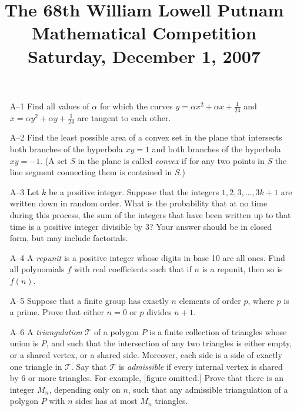 \documentclass[amssymb,twocolumn,pra,10pt,aps]{revtex4-1}
\begin{document}
\title{The 68th William Lowell Putnam Mathematical Competition \\
    Saturday, December 1, 2007}
\maketitle

\begin{itemize}

\item[A--1]
Find all values of $\alpha$ for which the curves $y = \alpha x^2 +
\alpha x + \frac{1}{24}$ and $x = \alpha y^2 + \alpha y + \frac{1}{24}$
are tangent to each other.

\item[A--2]
Find the least possible area of a convex set in the plane that
intersects both branches of the hyperbola $xy = 1$ and both branches of
the hyperbola $xy = -1$. (A set $S$ in the plane is called \emph{convex}
if for any two points in $S$ the line segment connecting them is
contained in $S$.)

\item[A--3]
Let $k$ be a positive integer. Suppose that the integers $1, 2, 3,
\dots, 3k+1$ are written down in random order. What is the probability
that at no time during this process, the sum of the integers that have
been written up to that time is a positive integer divisible by 3? Your
answer should be in closed form, but may include factorials.

\item[A--4]
A \emph{repunit} is a positive integer whose digits in base 10 are
all ones. Find all polynomials $f$ with real coefficients such that if
$n$ is a repunit, then so is $f(n)$.

\item[A--5]
Suppose that a finite group has exactly $n$ elements of order $p$,
where $p$ is a prime. Prove that either $n=0$ or $p$ divides $n+1$.

\item[A--6]
A \emph{triangulation} $\mathcal{T}$ of a polygon $P$ is a finite
collection of triangles whose union is $P$, and such that the
intersection of any two triangles is either empty, or a shared vertex,
or a shared side. Moreover, each side is a side of exactly one triangle
in $\mathcal{T}$. Say that $\mathcal{T}$ is \emph{admissible} if every
internal vertex is shared by 6 or more triangles. For example, [figure
omitted.] Prove that there is an integer $M_n$, depending only on $n$,
such that any admissible triangulation of a polygon $P$ with $n$ sides
has at most $M_n$ triangles.


\end{itemize}
\end{document}
